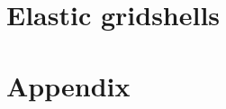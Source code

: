 %
%
%




\graphicspath{{./ch4_energy/img/}{./ch3_geometry/img/}}

\usepackage[active,tightpage,displaymath]{preview}



\frontmatter



%
%

\setcounter{tocdepth}{2}
\tableofcontents



\setlength{\parskip}{1em}

\mainmatter

\part{Elastic gridshells}



%
%
%
%

\part{Appendix}


\backmatter


